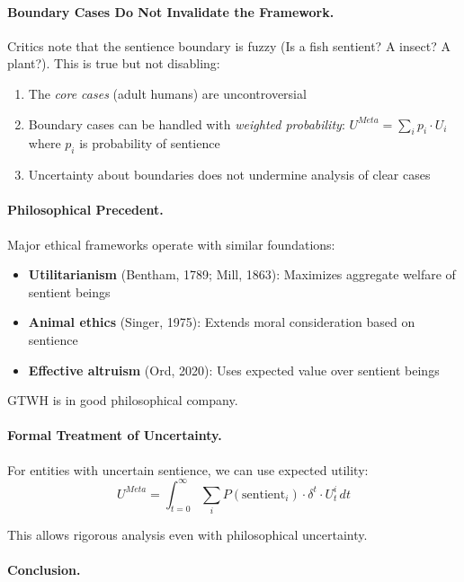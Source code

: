 \documentclass[12pt,a4paper]{article}
\begin{document}
\paragraph{Boundary Cases Do Not Invalidate the Framework.}

Critics note that the sentience boundary is fuzzy (Is a fish sentient? 
A insect? A plant?). This is true but not disabling:
\begin{enumerate}[nosep]
\item The \textit{core cases} (adult humans) are uncontroversial
\item Boundary cases can be handled with \textit{weighted probability}: 
$U^{Meta} = \sum_i p_i \cdot U_i$ where $p_i$ is probability of sentience
\item Uncertainty about boundaries does not undermine analysis of clear cases
\end{enumerate}

\paragraph{Philosophical Precedent.}

Major ethical frameworks operate with similar foundations:
\begin{itemize}[nosep]
\item \textbf{Utilitarianism} (Bentham, 1789; Mill, 1863): Maximizes aggregate 
welfare of sentient beings
\item \textbf{Animal ethics} (Singer, 1975): Extends moral consideration 
based on sentience
\item \textbf{Effective altruism} (Ord, 2020): Uses expected value over 
sentient beings
\end{itemize}

GTWH is in good philosophical company.

\paragraph{Formal Treatment of Uncertainty.}

For entities with uncertain sentience, we can use expected utility:
\begin{equation}
U^{Meta} = \int_{t=0}^{\infty} \sum_{i} P(\text{sentient}_i) \cdot \delta^t \cdot U^i_t \, dt
\end{equation}

This allows rigorous analysis even with philosophical uncertainty.

\paragraph{Conclusion.}
\end{document}
